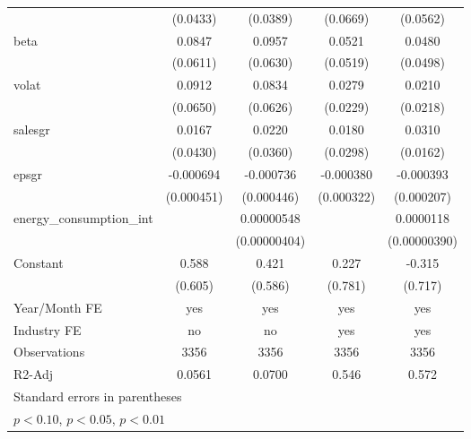 \begin{table}[htbp]
\begin{tabular}{l*{4}{c}}
                    &    (0.0433)         &    (0.0389)         &    (0.0669)         &    (0.0562)         \\
[1em]
beta                &      0.0847         &      0.0957         &      0.0521         &      0.0480         \\
                    &    (0.0611)         &    (0.0630)         &    (0.0519)         &    (0.0498)         \\
[1em]
volat               &      0.0912         &      0.0834         &      0.0279         &      0.0210         \\
                    &    (0.0650)         &    (0.0626)         &    (0.0229)         &    (0.0218)         \\
[1em]
salesgr             &      0.0167         &      0.0220         &      0.0180         &      0.0310\sym{*}  \\
                    &    (0.0430)         &    (0.0360)         &    (0.0298)         &    (0.0162)         \\
[1em]
epsgr               &   -0.000694         &   -0.000736         &   -0.000380         &   -0.000393\sym{*}  \\
                    &  (0.000451)         &  (0.000446)         &  (0.000322)         &  (0.000207)         \\
[1em]
energy\_consumption\_int&                     &  0.00000548         &                     &   0.0000118\sym{***}\\
                    &                     &(0.00000404)         &                     &(0.00000390)         \\
[1em]
Constant            &       0.588         &       0.421         &       0.227         &      -0.315         \\
                    &     (0.605)         &     (0.586)         &     (0.781)         &     (0.717)         \\
\hline
Year/Month FE       &         yes         &         yes         &         yes         &         yes         \\
Industry FE         &          no         &          no         &         yes         &         yes         \\
Observations        &        3356         &        3356         &        3356         &        3356         \\
R2-Adj              &      0.0561         &      0.0700         &       0.546         &       0.572         \\
\hline\hline
\multicolumn{5}{l}{\footnotesize Standard errors in parentheses}\\
\multicolumn{5}{l}{\footnotesize \sym{*} \(p<0.10\), \sym{**} \(p<0.05\), \sym{***} \(p<0.01\)}\\
\end{tabular}
\end{table}

